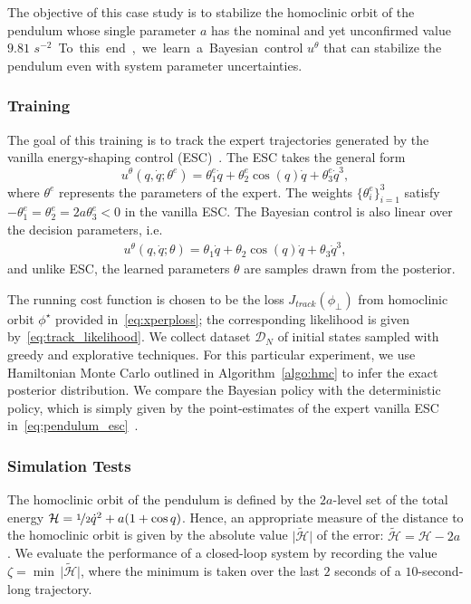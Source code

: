The objective of this case study is to stabilize the homoclinic orbit of the
pendulum whose single parameter $a$ has the nominal and yet unconfirmed value
$9.81$ \unit{$s^{-2}$}. To this end, we learn a Bayesian control $u^\theta$ that
can stabilize the pendulum even with system parameter uncertainties.

\subsubsection{Training} 
The goal of this training is to track the expert trajectories generated by the
vanilla energy-shaping control (ESC)~\cite{underactuated}. The ESC takes the
general form
%
\begin{equation}
    u^\theta(q, \dot{q}; \theta^e) = \theta^e_1 \dot{q} + \theta^e_2 \cos{(q)} \dot{q} + \theta^e_3 \dot{q}^3,
    \label{eq:pendulum_esc}
\end{equation}
%
where $\theta^e$ represents the parameters of the expert. The weights
$\{\theta^e_i\}_{i=1}^3$ satisfy $-\theta^e_1 = \theta^e_2 = 2a \theta^e_3 < 0$
in the vanilla ESC. 
%
The Bayesian control is also linear over the decision parameters, i.e.
\begin{align*}
    u^\theta(q, \dot{q}; \theta) = \theta_1 \dot{q} + \theta_2 \cos{(q)} \dot{q} + \theta_3 \dot{q}^3,
\end{align*}
and unlike ESC, the learned parameters $\theta$ are samples drawn from the posterior.


The running cost function is chosen to be the loss $J_{track}(\phi_\bot)$ from
homoclinic orbit $\phi^\star$ provided in~\eqref{eq:xperploss}; the
corresponding likelihood is given by~\eqref{eq:track_likelihood}. We collect
dataset $\mathcal{D}_N$ of initial states sampled with greedy and explorative
techniques. For this particular experiment, we use Hamiltonian Monte Carlo
outlined in Algorithm~\ref{algo:hmc} to infer the exact posterior distribution.
We compare the Bayesian policy with the deterministic policy, which is simply
given by the point-estimates of the expert vanilla ESC
in~\eqref{eq:pendulum_esc}~\cite{acc}.

\subsubsection{Simulation Tests} 
The homoclinic orbit of the pendulum is defined by the $2a$-level set of the
total energy $\mathcal{H} = \nicefrac{1}{2}\dot{q}^2 + a(1 +
\cos{q})$. Hence, an appropriate measure of the distance to the
homoclinic orbit is given by the absolute value $\bigl| \mathcal{\tilde{H}}
\bigr|$ of the error: $\mathcal{\tilde{H}} = \mathcal{H} - 2a$. We evaluate the
performance of a closed-loop system by recording the value $\zeta = \min \,
\bigl| \mathcal{\tilde{H}} \bigr|$, where the minimum is taken over the last $2$
seconds of a $10$-second-long trajectory.


